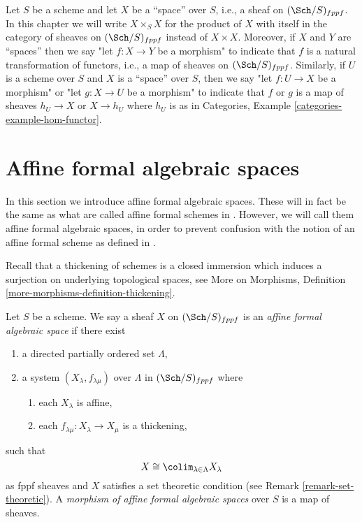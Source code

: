 \medskip\noindent
Let $S$ be a scheme and let $X$ be a ``space'' over $S$, i.e., a sheaf on
$(\Sch/S)_{fppf}$. In this chapter we will write $X \times_S X$ for the
product of $X$ with itself in the category of sheaves on $(\Sch/S)_{fppf}$
instead of $X \times X$. Moreover, if $X$ and $Y$ are ``spaces'' then
we say "let $f : X \to Y$ be a morphism" to indicate that $f$ is a
natural transformation of functors, i.e., a map of sheaves on
$(\Sch/S)_{fppf}$. Similarly, if $U$ is a scheme over $S$ and
$X$ is a ``space'' over $S$, then we say
"let $f : U \to X$ be a morphism" or
"let $g : X \to U$ be a morphism" to indicate that $f$ or $g$
is a map of sheaves $h_U \to X$ or $X \to h_U$ where $h_U$ is as in
Categories, Example \ref{categories-example-hom-functor}.





\section{Affine formal algebraic spaces}
\label{section-affine-formal-algebraic-spaces}

\noindent
In this section we introduce affine formal algebraic spaces.
These will in fact be the same as what are called affine
formal schemes in \cite{BVGD}. However, we will call
them affine formal algebraic spaces, in order to prevent confusion with
the notion of an affine formal scheme as defined in \cite{EGA}.

\medskip\noindent
Recall that a thickening of schemes is a closed
immersion which induces a surjection on underlying topological
spaces, see More on Morphisms, Definition
\ref{more-morphisms-definition-thickening}.

\begin{definition}
\label{definition-affine-formal-algebraic-space}
Let $S$ be a scheme. We say a sheaf $X$ on $(\Sch/S)_{fppf}$ is an
{\it affine formal algebraic space} if there exist
\begin{enumerate}
\item a directed partially ordered set $\Lambda$,
\item a system $(X_\lambda, f_{\lambda \mu})$ over $\Lambda$
in $(\Sch/S)_{fppf}$ where
\begin{enumerate}
\item each $X_\lambda$ is affine,
\item each $f_{\lambda \mu} : X_\lambda \to X_\mu$ is a thickening,
\end{enumerate}
\end{enumerate}
such that
$$
X \cong \colim_{\lambda \in \Lambda} X_\lambda
$$
as fppf sheaves and $X$ satisfies a set theoretic condition
(see Remark \ref{remark-set-theoretic}). A
{\it morphism of affine formal algebraic spaces}
over $S$ is a map of sheaves.
\end{definition}

